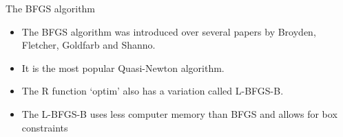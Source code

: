 \documentclass[10pt]{beamer}
\begin{document}
                                                                                              \begin{frame}{The BFGS algorithm}
                                                                                                \begin{itemize}
                                                                                                \item The BFGS algorithm was introduced over several papers by Broyden, Fletcher, Goldfarb and Shanno.

                                                                                                \item It is the most popular Quasi-Newton algorithm.

                                                                                                \item The R function `optim' also has a variation called L-BFGS-B.
                                                                                                \item The L-BFGS-B uses less computer memory than BFGS and allows for box constraints
                                                                                                \end{itemize}
                                                                                              \end{frame}
\end{document}
